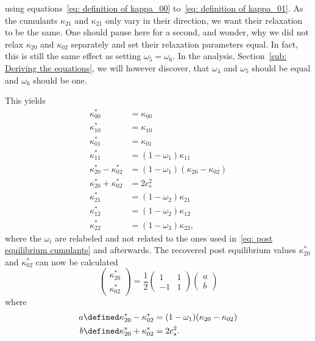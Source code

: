 using equations~\eqref{eq: definition of kappa_00} to~\eqref{eq: definition of kappa_01}.
As the cumulants $\kappa_{21}$ and $\kappa_{21}$ only vary in their direction, we want their relaxation to be the same.
One should pause here for a second, and wonder, why we did not relax $\kappa_{20}$ and $\kappa_{02}$ separately and set their relaxation parameters equal.
In fact, this is still the same effect as setting $\omega_5=\omega_6$.
In the analysis, Section~\ref{sub: Deriving the equations}, we will however discover, that $\omega_4$ and $\omega_5$ should be equal and $\omega_6$ should be one.

This yields
\begin{equation}
  \label{eq: collision equation system full}
  \begin{aligned}
    \kappa_{00}^{*} & = \kappa_{00} \\
    \kappa_{10}^{*} & = \kappa_{10} \\
    \kappa_{01}^{*} & = \kappa_{01} \\
    \kappa_{11}^{*} & = (1-\omega_1)\kappa_{11} \\
    \kappa_{20}^{*} - \kappa_{02}^{*}
      & = (1-\omega_1) (\kappa_{20} - \kappa_{02}) \\
    \kappa_{20}^{*} + \kappa_{02}^{*}
      & = 2 c_s^2 \\
    \kappa_{21}^{*} & = (1-\omega_2)\kappa_{21} \\
    \kappa_{12}^{*} & = (1-\omega_2)\kappa_{12} \\
    \kappa_{22}^{*} & = (1-\omega_3)\kappa_{22},
  \end{aligned}
\end{equation}
where the $\omega_i$ are relabeled and not related to the ones used in~\eqref{eq: post equilibrium cumulants} and afterwards.
The recovered post equilibrium values $\kappa_{20}^{*}$ and $\kappa_{02}^{*}$ can now be calculated
\begin{equation}
  \begin{pmatrix}
    \kappa_{20}^{*} \\
    \kappa_{02}^{*}
  \end{pmatrix}
  = \frac{1}{2}
  \begin{pmatrix}
    1 & 1 \\ -1 & 1
  \end{pmatrix}
  \begin{pmatrix}
    a\\
    b
  \end{pmatrix}
\end{equation}
where
\begin{equation}
 \begin{aligned}
   a \defined \kappa_{20}^{*} - \kappa_{02}^{*}
     & = (1-\omega_1) (\kappa_{20} - \kappa_{02}) \\
   b \defined \kappa_{20}^{*} + \kappa_{02}^{*}
     & = 2 c_s^2 .
 \end{aligned}
\end{equation}

